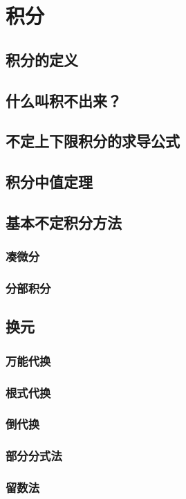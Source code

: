 \documentclass[lang=cn,newtx,10pt,scheme=chinese]{elegantbook}
\begin{document}
	\section{积分}
    \subsection{积分的定义}
    \subsection{什么叫积不出来？}
    \subsection{不定上下限积分的求导公式}
    \subsection{积分中值定理}
    \subsection{基本不定积分方法}
    \subsubsection{凑微分}
    \subsubsection{分部积分}
    \subsection{换元}
    \subsubsection{万能代换}
    \subsubsection{根式代换}
    \subsubsection{倒代换}
    \subsubsection{部分分式法}
    \subsubsection{留数法}
\end{document}
